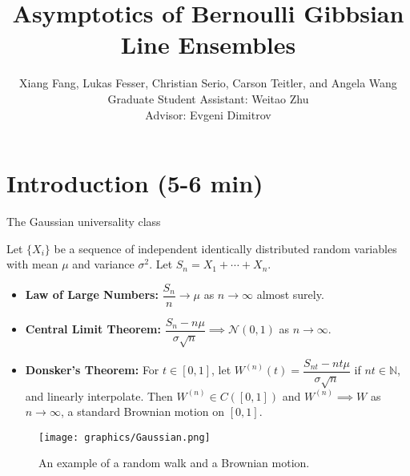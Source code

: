 \documentclass[9pt,t,dvipsnames]{beamer}
\title{Asymptotics of Bernoulli Gibbsian Line Ensembles}
\author[Fang, Fesser, Serio, Teitler, and Wang]{Xiang Fang, Lukas Fesser, Christian Serio, Carson Teitler, and Angela Wang \\
Graduate Student Assistant: Weitao Zhu\\
Advisor: Evgeni Dimitrov}
\institute[Columbia]{Columbia University REU}
\begin{document}
	
	\begin{frame}
		\maketitle
	\end{frame}


\section{Introduction (5-6 min)}

\begin{frame}{The Gaussian universality class}

Let $\{X_i\}$ be a sequence of independent identically distributed random variables with mean $\mu$ and variance $\sigma^2$. Let $S_n = X_1 + \cdots + X_n$.

\bigskip

\begin{itemize}
\item \textbf{Law of Large Numbers:} $\dfrac{S_n}{n} \longrightarrow \mu$ as $n \rightarrow \infty$ almost surely.

\bigskip

\item \textbf{Central Limit Theorem:} $\dfrac{S_n - n\mu}{\sigma\sqrt{n}} \implies \mathcal{N}(0, 1)$ as $n \rightarrow \infty$.

\bigskip

\item \textbf{Donsker's Theorem:} For $t\in[0,1]$, let $W^{(n)}(t) = \dfrac{S_{nt}-nt\mu}{\sigma\sqrt{n}}$ if $nt\in\mathbb{N}$, and linearly interpolate. Then $W^{(n)} \in C([0, 1])$ and $W^{(n)} \implies W$ as $n\to\infty$, a standard Brownian motion on $[0,1]$.
\end{itemize}
\begin{figure}
\texttt{[image: graphics/Gaussian.png]}
\caption{An example of a random walk and a Brownian motion.}
\end{figure}

\end{frame}
\end{document}

